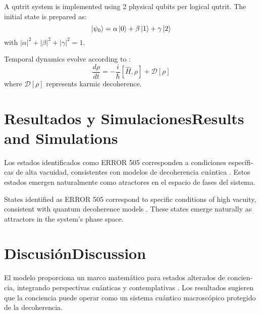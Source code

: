 \documentclass[12pt,a4paper]{article}
\newcommand{\es}[1]{\foreignlanguage{spanish}{#1}}
\newcommand{\en}[1]{\foreignlanguage{english}{#1}}
\begin{document}
\begin{otherlanguage}{english}
A qutrit system is implemented using 2 physical qubits per logical qutrit. The initial state is prepared as:
\begin{equation}
\ket{\psi_0} = \alpha\ket{0} + \beta\ket{1} + \gamma\ket{2}
\end{equation}
with $|\alpha|^2 + |\beta|^2 + |\gamma|^2 = 1$.

Temporal dynamics evolve according to \cite{fisher2015}:
\begin{equation}
\frac{d\rho}{dt} = -\frac{i}{\hbar}[\hat{H}, \rho] + \mathcal{D}[\rho]
\end{equation}
where $\mathcal{D}[\rho]$ represents karmic decoherence.
\end{otherlanguage}

\section{\es{Resultados y Simulaciones}\en{Results and Simulations}}

\begin{otherlanguage}{spanish}
Los estados identificados como ERROR 505 corresponden a condiciones específicas de alta vacuidad, consistentes con modelos de decoherencia cuántica \cite{vitiello2001}. Estos estados emergen naturalmente como atractores en el espacio de fases del sistema.
\end{otherlanguage}

\begin{otherlanguage}{english}
States identified as ERROR 505 correspond to specific conditions of high vacuity, consistent with quantum decoherence models \cite{vitiello2001}. These states emerge naturally as attractors in the system's phase space.
\end{otherlanguage}

\section{\es{Discusión}\en{Discussion}}

\begin{otherlanguage}{spanish}
El modelo proporciona un marco matemático para estados alterados de conciencia, integrando perspectivas cuánticas \cite{hameroff2014} y contemplativas \cite{wallace2007}. Los resultados sugieren que la conciencia puede operar como un sistema cuántico macroscópico protegido de la decoherencia.
\end{otherlanguage}
\end{document}
